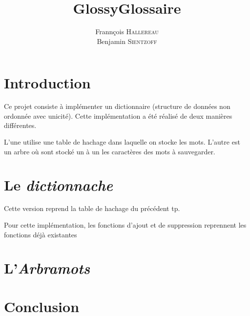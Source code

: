 \documentclass[12pt,a4paper,final]{article}
\author{Frannçois \textsc{Hallereau} \\ Benjamin \textsc{Sientzoff}}
\title{GlossyGlossaire}
\begin{document}
\maketitle

\vspace{5cm}

\tableofcontents

\newpage

\section*{Introduction}
Ce projet consiste à implémenter un dictionnaire (structure de données non ordonnée avec unicité). Cette implémentation a été réalisé de deux manières différentes. 

L'une utilise une table de hachage dans laquelle on stocke les mots. L'autre est un arbre où sont stocké un à un les caractères des mots à sauvegarder.

\section{Le \emph{dictionnache}}
Cette version reprend la table de hachage du précédent tp.

Pour cette implémentation, les fonctions d'ajout et de suppression reprennent les fonctions déjà existantes 

\section{L'\emph{Arbramots}}

\section*{Conclusion}
\end{document}

